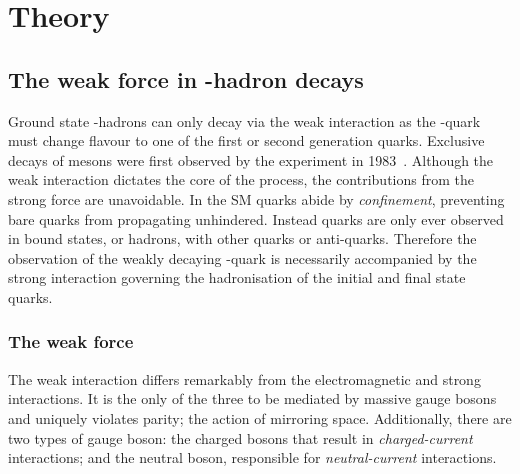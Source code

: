 \chapter{Theory} 
\label{ch:theory}

\minitoc





\section{The weak force in \bquark-hadron decays}

Ground state \bquark-hadrons can only decay via the weak interaction as the \bquark-quark must change flavour to one of the first or second generation quarks.
Exclusive decays of \B mesons were first observed by the \cleo experiment in 1983~\cite{PhysRevLett.50.881}. Although the weak interaction dictates the core of the process, the contributions from the strong force are unavoidable. In the SM quarks abide by \emph{confinement}, preventing bare quarks from propagating unhindered. Instead quarks are only ever observed in bound states, or hadrons, with other quarks or anti-quarks. Therefore the observation of the weakly decaying \bquark-quark is necessarily accompanied by the strong interaction governing the hadronisation of the initial and final state quarks.


\subsection{The weak force}

The weak interaction differs remarkably from the electromagnetic and strong interactions. It is the only of the three to be mediated by massive gauge bosons and uniquely violates parity; the action of mirroring space. 
Additionally, there are two types of gauge boson: the charged \Wpm bosons that result in \emph{charged-current} interactions; and the neutral \Z boson, responsible for \emph{neutral-current} interactions. 

